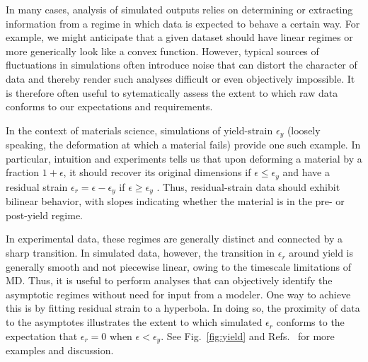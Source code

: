 In many cases, analysis of simulated outputs relies on determining or extracting information from a regime in which data is expected to behave a certain way.  For example, we might anticipate that a given dataset should have linear regimes or more generically look like a convex function.  However, typical sources of fluctuations in simulations often introduce noise that can distort the character of data and thereby render such analyses difficult or even objectively impossible.  It is therefore often useful to sytematically assess the extent to which raw data conforms to our expectations and requirements.

In the context of materials science, simulations of yield-strain $\epsilon_y$ (loosely speaking, the deformation at which a material fails) provide one such example.  In particular, intuition and experiments tells us that upon deforming a material by a fraction $1+\epsilon$, it should recover its original dimensions if $\epsilon \le \epsilon_y$ and have a residual strain $\epsilon_r = \epsilon - \epsilon_y$ if $\epsilon \ge \epsilon_y$ \cite{patrone2}.  Thus, residual-strain data should exhibit bilinear behavior, with slopes indicating whether the material is in the pre- or post-yield regime.

In experimental data, these regimes are generally distinct and connected by a sharp transition.  In simulated data, however, the transition in $\epsilon_r$ around yield is generally smooth and not piecewise linear, owing to the timescale limitations of MD.  Thus, it is useful to perform analyses that can objectively identify the asymptotic regimes without need for input from a modeler.  One way to achieve this is by fitting residual strain to a hyperbola.  In doing so, the proximity of data to the asymptotes illustrates the extent to which simulated $\epsilon_r$ conforms to the expectation that $\epsilon_r=0$ when $\epsilon < \epsilon_y$.  See Fig.~\ref{fig:yield} and Refs.~\cite{patrone1,patrone2} for more examples and discussion.

